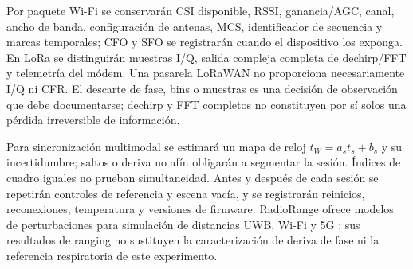 Por paquete Wi-Fi se conservarán CSI disponible, RSSI, ganancia/AGC, canal, ancho de
banda, configuración de antenas, MCS, identificador de secuencia y marcas temporales;
CFO y SFO se registrarán cuando el dispositivo los exponga. En LoRa se distinguirán
muestras I/Q, salida compleja completa de dechirp/FFT y telemetría del módem.
Una pasarela LoRaWAN no proporciona necesariamente I/Q ni CFR. El descarte de fase,
bins o muestras es una decisión de observación que debe documentarse; dechirp y FFT
completos no constituyen por sí solos una pérdida irreversible de información.

Para sincronización multimodal se estimará un mapa de reloj
$t_W=a_s t_s+b_s$ y su incertidumbre; saltos o deriva no afín obligarán a segmentar
la sesión. Índices de cuadro iguales no prueban simultaneidad. Antes y después de
cada sesión se repetirán controles de referencia y escena vacía, y se registrarán
reinicios, reconexiones, temperatura y versiones de firmware. RadioRange ofrece
modelos de perturbaciones para simulación de distancias UWB, Wi-Fi y 5G
\citep{Lyu2026RadioRange}; sus resultados de ranging no sustituyen la caracterización
de deriva de fase ni la referencia respiratoria de este experimento.
